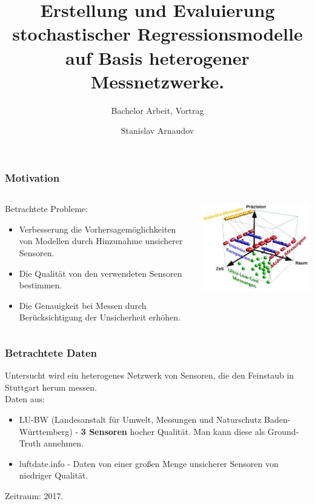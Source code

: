 \documentclass[18pt]{beamer}
\title[Short title]{Erstellung und Evaluierung stochastischer Regressionsmodelle auf Basis heterogener Messnetzwerke.}
\subtitle{Bachelor Arbeit, Vortrag}
\author{Stanislav Arnaudov}
\institute{TECO - Das Telecooperation Office}
\begin{document}
 



\begin{frame}
 \titlepage
\end{frame}

\begin{frame}
  \frametitle{Motivation}
  
  \begin{columns}
    \begin{column}{0.4\textwidth}
      Betrachtete Probleme:
      \begin{itemize}
      \item Verbesserung die Vorhersagemöglichkeiten von Modellen durch Hinzunahme unsicherer Sensoren.
      \item Die Qualität von den verwendeten Sensoren bestimmen.
      \item Die Genauigkeit bei Messen durch Berücksichtigung der Unsicherheit erhöhen.
      \end{itemize}
      
    \end{column}
    \begin{column}{0.6\textwidth}
      \begin{center}
        \includegraphics[scale=0.5]{images/motivation}
      \end{center}
    \end{column}
  \end{columns}
  
\end{frame}

\begin{frame}
  \frametitle{Betrachtete Daten}
  Untersucht wird ein heterogenes Netzwerk von Sensoren, die den Feinstaub in Stuttgart herum messen.\\
  Daten aus:
  \begin{itemize}
  \item LU-BW (Landesanstalt für Umwelt, Messungen und Naturschutz Baden-Württemberg) - \textbf{3 Sensoren} hocher Qualität. Man kann diese als Ground-Truth annehmen.
  \item luftdate.info - Daten von einer großen Menge unsicherer Sensoren von niedriger Qualität.
  \end{itemize}
  Zeitraum: 2017.
  
\end{frame}
\end{document}
